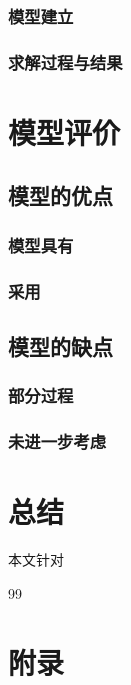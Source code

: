 \documentclass[UTF-8,a4paper,zihao=-4]{ctexart}
\begin{document}
\subsubsection{模型建立}

\subsubsection{求解过程与结果}

\section{模型评价}
\subsection{模型的优点}
\subsubsection{模型具有}

\subsubsection{采用}

\subsection{模型的缺点}
\subsubsection{部分过程}

\subsubsection{未进一步考虑}

\section{总结}

本文针对

\begin{thebibliography}{99}   %

\end{thebibliography}

\section*{附录}
\appendix
\end{document}
